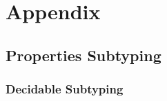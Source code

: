 \chapter{Appendix}

\section{Properties Subtyping}\label{sec:app:proofs}

\subsection{Decidable Subtyping}\label{subsec:app:proofs:dec}

